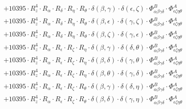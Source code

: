 \documentclass{article}
\begin{document}
\begin{equation}
\begin{array}{c}
 \\[0.2em] 		 + 10395 \cdot R_{z}^{4} \cdot R_{\alpha{}} \cdot R_{\delta{}} \cdot R_{\eta{}} \cdot R_{\theta{}} \cdot \delta{}\left(\beta{}, \gamma{}\right) \cdot \delta{}\left(\epsilon{}, \zeta{}\right) \cdot \Phi{}^{B}_{\alpha{}\beta{}\gamma{}\delta{}} \cdot \Phi{}^{A}_{\epsilon{}\zeta{}\eta{}\theta{}} 
 \\[0.2em] 		 + 10395 \cdot R_{z}^{4} \cdot R_{\alpha{}} \cdot R_{\delta{}} \cdot R_{\eta{}} \cdot R_{\theta{}} \cdot \delta{}\left(\beta{}, \epsilon{}\right) \cdot \delta{}\left(\gamma{}, \zeta{}\right) \cdot \Phi{}^{B}_{\alpha{}\beta{}\gamma{}\delta{}} \cdot \Phi{}^{A}_{\epsilon{}\zeta{}\eta{}\theta{}} 
 \\[0.2em] 		 + 10395 \cdot R_{z}^{4} \cdot R_{\alpha{}} \cdot R_{\delta{}} \cdot R_{\eta{}} \cdot R_{\theta{}} \cdot \delta{}\left(\beta{}, \zeta{}\right) \cdot \delta{}\left(\gamma{}, \epsilon{}\right) \cdot \Phi{}^{B}_{\alpha{}\beta{}\gamma{}\delta{}} \cdot \Phi{}^{A}_{\epsilon{}\zeta{}\eta{}\theta{}} 
 \\[0.2em] 		 + 10395 \cdot R_{z}^{4} \cdot R_{\alpha{}} \cdot R_{\epsilon{}} \cdot R_{\zeta{}} \cdot R_{\eta{}} \cdot \delta{}\left(\beta{}, \gamma{}\right) \cdot \delta{}\left(\delta{}, \theta{}\right) \cdot \Phi{}^{B}_{\alpha{}\beta{}\gamma{}\delta{}} \cdot \Phi{}^{A}_{\epsilon{}\zeta{}\eta{}\theta{}} 
 \\[0.2em] 		 + 10395 \cdot R_{z}^{4} \cdot R_{\alpha{}} \cdot R_{\epsilon{}} \cdot R_{\zeta{}} \cdot R_{\eta{}} \cdot \delta{}\left(\beta{}, \delta{}\right) \cdot \delta{}\left(\gamma{}, \theta{}\right) \cdot \Phi{}^{B}_{\alpha{}\beta{}\gamma{}\delta{}} \cdot \Phi{}^{A}_{\epsilon{}\zeta{}\eta{}\theta{}} 
 \\[0.2em] 		 + 10395 \cdot R_{z}^{4} \cdot R_{\alpha{}} \cdot R_{\epsilon{}} \cdot R_{\zeta{}} \cdot R_{\eta{}} \cdot \delta{}\left(\beta{}, \theta{}\right) \cdot \delta{}\left(\gamma{}, \delta{}\right) \cdot \Phi{}^{B}_{\alpha{}\beta{}\gamma{}\delta{}} \cdot \Phi{}^{A}_{\epsilon{}\zeta{}\eta{}\theta{}} 
 \\[0.2em] 		 + 10395 \cdot R_{z}^{4} \cdot R_{\alpha{}} \cdot R_{\epsilon{}} \cdot R_{\zeta{}} \cdot R_{\theta{}} \cdot \delta{}\left(\beta{}, \gamma{}\right) \cdot \delta{}\left(\delta{}, \eta{}\right) \cdot \Phi{}^{B}_{\alpha{}\beta{}\gamma{}\delta{}} \cdot \Phi{}^{A}_{\epsilon{}\zeta{}\eta{}\theta{}} 
 \\[0.2em] 		 + 10395 \cdot R_{z}^{4} \cdot R_{\alpha{}} \cdot R_{\epsilon{}} \cdot R_{\zeta{}} \cdot R_{\theta{}} \cdot \delta{}\left(\beta{}, \delta{}\right) \cdot \delta{}\left(\gamma{}, \eta{}\right) \cdot \Phi{}^{B}_{\alpha{}\beta{}\gamma{}\delta{}} \cdot \Phi{}^{A}_{\epsilon{}\zeta{}\eta{}\theta{}} 

\end{array}
\end{equation}
\end{document}
